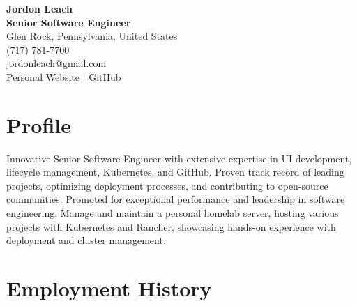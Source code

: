 \documentclass[a4paper,10pt]{article}
\begin{document}
\begin{center}
    \textbf{\Huge Jordon Leach} \\
    \vspace{2mm}
    \textbf{Senior Software Engineer} \\
    \vspace{2mm}
    Glen Rock, Pennsylvania, United States \\
    (717) 781-7700 \\
    jordonleach@gmail.com \\
    \href{https://jordonleach.dev}{\underline{Personal Website}} | \href{https://github.com/jordojordo}{\underline{GitHub}} \\
\end{center}

\vspace{5mm}

\section*{Profile}
Innovative Senior Software Engineer with extensive expertise in UI development, lifecycle management, Kubernetes, and GitHub. Proven track record of leading projects, optimizing deployment processes, and contributing to open-source communities. Promoted for exceptional performance and leadership in software engineering. Manage and maintain a personal homelab server, hosting various projects with Kubernetes and Rancher, showcasing hands-on experience with deployment and cluster management.

\section*{Employment History}
\end{document}
